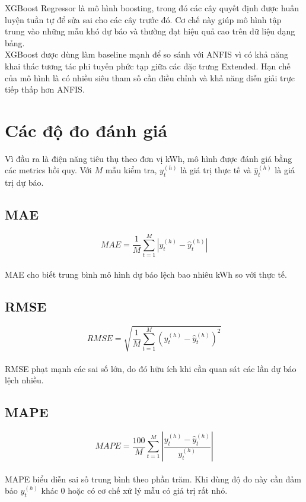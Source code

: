 XGBoost Regressor là mô hình boosting, trong đó các cây quyết định được huấn luyện tuần tự để sửa sai cho các cây trước đó. Cơ chế này giúp mô hình tập trung vào những mẫu khó dự báo và thường đạt hiệu quả cao trên dữ liệu dạng bảng.
\\
XGBoost được dùng làm baseline mạnh để so sánh với ANFIS vì có khả năng khai thác tương tác phi tuyến phức tạp giữa các đặc trưng Extended. Hạn chế của mô hình là có nhiều siêu tham số cần điều chỉnh và khả năng diễn giải trực tiếp thấp hơn ANFIS.

\section{Các độ đo đánh giá}

Vì đầu ra là điện năng tiêu thụ theo đơn vị kWh, mô hình được đánh giá bằng các metrics hồi quy. Với $M$ mẫu kiểm tra, $y_t^{(h)}$ là giá trị thực tế và $\hat{y}_t^{(h)}$ là giá trị dự báo.

\subsection{MAE}

\begin{equation}
  MAE = \frac{1}{M}\sum_{t=1}^{M}|y_t^{(h)} - \hat{y}_t^{(h)}|
\end{equation}
\\
MAE cho biết trung bình mô hình dự báo lệch bao nhiêu kWh so với thực tế.

\subsection{RMSE}

\begin{equation}
  RMSE = \sqrt{\frac{1}{M}\sum_{t=1}^{M}(y_t^{(h)} - \hat{y}_t^{(h)})^2}
\end{equation}
\\
RMSE phạt mạnh các sai số lớn, do đó hữu ích khi cần quan sát các lần dự báo lệch nhiều.

\subsection{MAPE}

\begin{equation}
  MAPE = \frac{100}{M}\sum_{t=1}^{M}\left|\frac{y_t^{(h)} - \hat{y}_t^{(h)}}{y_t^{(h)}}\right|
\end{equation}
\\
MAPE biểu diễn sai số trung bình theo phần trăm. Khi dùng độ đo này cần đảm bảo $y_t^{(h)}$ khác 0 hoặc có cơ chế xử lý mẫu có giá trị rất nhỏ.

